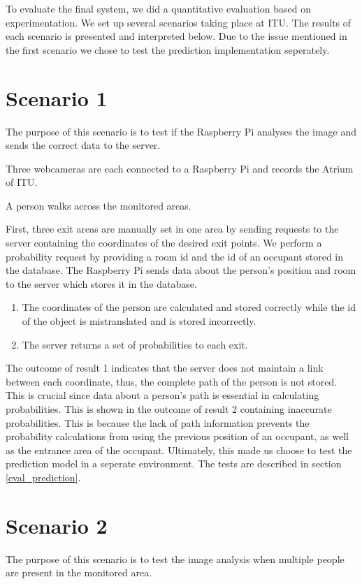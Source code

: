 To evaluate the final system, we did a quantitative evaluation based on experimentation. We set up several scenarios taking place at ITU. The results of each scenario is presented and interpreted below. Due to the issue mentioned in the first scenario we chose to test the prediction implementation seperately.

\section{Scenario 1}
\label{sec:scen1}
The purpose of this scenario is to test if the Raspberry Pi analyses the image and sends the correct data to the server. 

Three webcameras are each connected to a Raspberry Pi and records the Atrium of ITU. 

A person walks across the monitored areas. 

First, three exit areas are manually set in one area by sending requests to the server containing the coordinates of the desired exit points. We perform a probability request by providing a room id and the id of an occupant stored in the database. The Raspberry Pi sends data about the person's position and room to the server which stores it in the database. 

\begin{enumerate}
\item The coordinates of the person are calculated and stored correctly while the id of the object is mistranslated and is stored incorrectly. 
\item The server returns a set of probabilities to each exit. 
\end{enumerate}

The outcome of result 1 indicates that the server does not maintain a link between each coordinate, thus, the complete path of the person is not stored. This is crucial since data about a person's path is essential in calculating probabilities. This is shown in the outcome of result 2 containing inaccurate probabilities. This is because the lack of path information prevents the probability calculations from using the previous position of an occupant, as well as the entrance area of the occupant. Ultimately, this made us choose to test the prediction model in a seperate environment. The tests are described in section \ref{eval_prediction}.

\section{Scenario 2}
The purpose of this scenario is to test the image analysis when multiple people are present in the monitored area.

